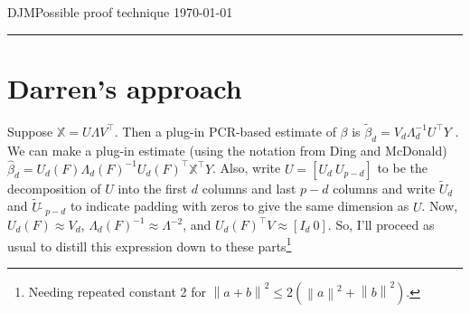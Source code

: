 \documentclass[11pt]{article}
\newcommand{\norm}[1]{\left\lVert #1 \right\rVert}
\newcommand{\X}{\mathbb{X}}
\begin{document}
\begin{center}
\noindent
DJM\hfill Possible proof technique \hfill \today \\
\rule{6.5in}{1pt}
\end{center}

\section{Darren's approach}
Suppose $\X = U\Lambda V^\top$. Then a plug-in PCR-based estimate of $\beta$
is $\tilde\beta_d= V_d\Lambda_d^{-1}U^\top Y$ .
We can make a plug-in estimate (using the notation from Ding and
McDonald) $\hat\beta_d= U_d(F )\Lambda_d(F )^{-1}U_d(F )^\top \X^\top
Y$.  Also, write $U = [U_d\ U_{p-d}]$ to be the decomposition of $U$
into the first $d$ columns and last $p-d$
columns and write $\tilde{U}_d$ and $\tilde{U}_{̃p-d}$ to indicate
padding with zeros to give the same dimension as $U$.
Now, $U_d(F ) \approx V_d$, $\Lambda_d(F )^{-1} \approx \Lambda^{-2}$,
and $U_d(F )^\top V \approx  [I_d\ 0]$. So, I’ll proceed as usual to distill this
 expression down to these parts\footnote{Needing repeated constant 2
   for $\norm{a + b}^2 \leq 2(\norm{a}^2 + \norm{b}^2)$.}
\end{document}
